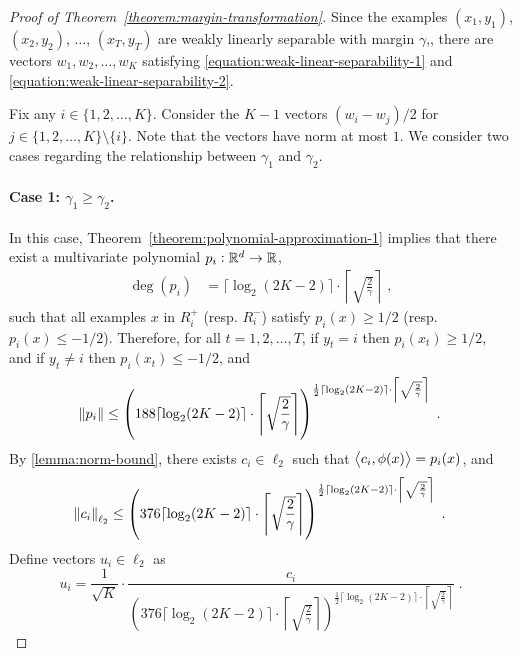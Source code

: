 
\begin{proof}[Proof of Theorem~\ref{theorem:margin-transformation}]
Since the examples $(x_1, y_1)$, $(x_2, y_2)$, $\dots$, $(x_T, y_T)$ are weakly
linearly separable with margin $\gamma$,, there are vectors $w_1, w_2, \dots, w_K$
satisfying \eqref{equation:weak-linear-separability-1} and
\eqref{equation:weak-linear-separability-2}.

Fix any $i \in \{1,2,\dots,K\}$. Consider the $K-1$ vectors $(w_i - w_j)/2$ for
$j \in \{1,2,\dots,K\} \setminus \{i\}$. Note that the vectors have norm at most
$1$. We consider two cases regarding the relationship between $\gamma_1$ and
$\gamma_2$.

\paragraph{Case 1: $\gamma_1 \geq \gamma_2$.} In this case, Theorem~\ref{theorem:polynomial-approximation-1}
implies that there exist a multivariate polynomial $p_i:\mathbb{R}^d \to \mathbb{R}$,
\begin{align*}
\deg(p_i) & = \lceil \log_2(2K-2) \rceil \cdot \left\lceil \sqrt{\frac{2}{\gamma}} \right\rceil \; ,
\end{align*}
such that all examples $x$ in $R_i^+$ (resp. $R_i^-$) satisfy $p_i(x) \geq 1/2$
(resp. $p_i(x) \leq -1/2$).
Therefore, for all $t=1,2,\dots,T$, if $y_t = i$ then $p_i(x_t) \ge 1/2$,
 and if $y_t \neq i$ then $p_i(x_t) \le -1/2$, and
\[
\norm{p_i} \le
\left(188 \lceil \log_2(2K-2) \rceil \cdot \left \lceil \sqrt{\frac{2}{\gamma}} \right \rceil \right)^{\frac{1}{2} \lceil \log_2(2K-2) \rceil
\cdot \left \lceil \sqrt{\frac{2}{\gamma}} \right \rceil} \; .
\]
By \autoref{lemma:norm-bound}, there exists $c_i \in \ell_2$ such that
$\left\langle c_i, \phi(x) \right\rangle = p_i(x)$, and
\[
\norm{c_i}_{\ell_2} \le
\left(376 \lceil \log_2(2K-2) \rceil \cdot \left \lceil \sqrt{\frac{2}{\gamma}} \right \rceil \right)^{\frac{1}{2} \lceil \log_2(2K-2) \rceil
\cdot \left \lceil \sqrt{\frac{2}{\gamma}} \right \rceil} \; .
\]
Define vectors $u_i \in \ell_2$ as
\[
u_i = \frac{1}{\sqrt{K}}
\cdot \frac{c_i}{\left(376 \lceil \log_2(2K-2) \rceil \cdot \left \lceil \sqrt{\frac{2}{\gamma}} \right \rceil \right)^{\frac{1}{2} \lceil \log_2(2K-2) \rceil
\cdot \left \lceil \sqrt{\frac{2}{\gamma}} \right \rceil}} \; .
\]


\end{proof}
